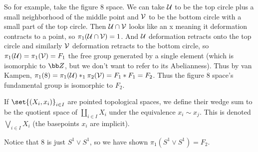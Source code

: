 So for example, take the figure $8$ space.
We can take ${\cal U}$ to be the top circle plus a small neighborhood of the middle point and ${\cal V}$ to be the bottom circle with a small part of the top circle.
Then ${\cal U}\cap{\cal V}$ looks like an {\sf x} meaning it deformation contracts to a point, so $\pi_1({\cal U}\cap{\cal V})=1$.
And ${\cal U}$ deformation retracts onto the top circle and similarly ${\cal V}$ deformation retracts to the bottom circle, so $\pi_1({\cal U})=\pi_1({\cal V})=F_1$ the free group generated by a single element (which is isomorphic
to ${\bb Z}$, but we don't want to refer to its Abelianness).
Thus by van Kampen, $\pi_1(8)=\pi_1({\cal U})*_1\pi_2({\cal V})=F_1*F_1=F_2$.
Thus the figure $8$ space's fundamental group is isomorphic to $F_2$.

\bdefn

    If $\set{(X_i,x_i)}_{i\in I}$ are pointed topological spaces, we define their {\emphcolor wedge sum} to be the quotient space of $\coprod_{i\in I}X_i$ under the equivalence $x_i\sim x_j$.
    This is denoted $\bigvee_{i\in I}X_i$ (the basepoints $x_i$ are implicit).

\edefn

Notice that $8$ is just $S^1\vee S^1$, so we have shown $\pi_1(S^1\vee S^1)=F_2$.

